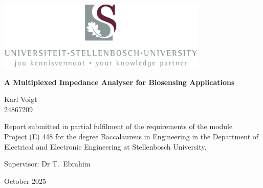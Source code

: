 \graphicspath{{frontmatter/fig/}}
\begin{titlepage}
	\begin{center}
		
		\includegraphics[width=10cm]{USlogo-top}
		
		\vfill
		
		{\sffamily \bfseries \huge A Multiplexed Impedance Analyser for Biosensing Applications \par}
		
		\vfill
		
		{\large {\Large Karl Voigt} \\ 24867209 \par}
		
		\vfill
		
		\vfill
		
		{Report submitted in partial fulfilment of the requirements of the module \\
			Project (E) 448 for the degree Baccalaureus in Engineering in the Department of
			Electrical and Electronic Engineering at Stellenbosch University. \par}
		
		\vfill
		
		{\large {Supervisor}: Dr T.\ Ebrahim} %
		
		\vfill
		
		{\Large October 2025}
	\end{center}
\end{titlepage}
